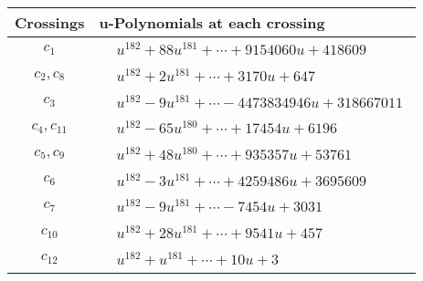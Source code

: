 \documentclass[1p]{elsarticle_modified}
\theoremstyle{definition}
\begin{document}
\begin{tabular}{m{50pt}|m{274pt}}
Crossings & \hspace{64pt}u-Polynomials at each crossing \\
\hline $$\begin{aligned}c_{1}\end{aligned}$$&$\begin{aligned}
&u^{182}+88 u^{181}+\cdots+9154060 u+418609
\end{aligned}$\\
\hline $$\begin{aligned}c_{2},c_{8}\end{aligned}$$&$\begin{aligned}
&u^{182}+2 u^{181}+\cdots+3170 u+647
\end{aligned}$\\
\hline $$\begin{aligned}c_{3}\end{aligned}$$&$\begin{aligned}
&u^{182}-9 u^{181}+\cdots-4473834946 u+318667011
\end{aligned}$\\
\hline $$\begin{aligned}c_{4},c_{11}\end{aligned}$$&$\begin{aligned}
&u^{182}-65 u^{180}+\cdots+17454 u+6196
\end{aligned}$\\
\hline $$\begin{aligned}c_{5},c_{9}\end{aligned}$$&$\begin{aligned}
&u^{182}+48 u^{180}+\cdots+935357 u+53761
\end{aligned}$\\
\hline $$\begin{aligned}c_{6}\end{aligned}$$&$\begin{aligned}
&u^{182}-3 u^{181}+\cdots+4259486 u+3695609
\end{aligned}$\\
\hline $$\begin{aligned}c_{7}\end{aligned}$$&$\begin{aligned}
&u^{182}-9 u^{181}+\cdots-7454 u+3031
\end{aligned}$\\
\hline $$\begin{aligned}c_{10}\end{aligned}$$&$\begin{aligned}
&u^{182}+28 u^{181}+\cdots+9541 u+457
\end{aligned}$\\
\hline $$\begin{aligned}c_{12}\end{aligned}$$&$\begin{aligned}
&u^{182}+u^{181}+\cdots+10 u+3
\end{aligned}$\\
\hline
\end{tabular}\\~\\
\end{document}
